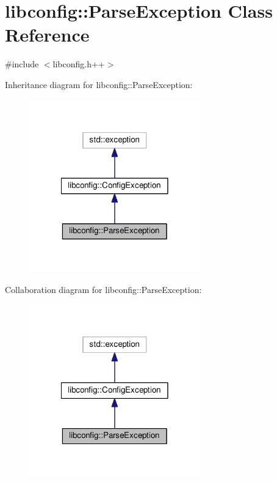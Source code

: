 \hypertarget{classlibconfig_1_1ParseException}{\section{libconfig\-:\-:Parse\-Exception Class Reference}
\label{classlibconfig_1_1ParseException}
}


{\ttfamily \#include $<$libconfig.\-h++$>$}



Inheritance diagram for libconfig\-:\-:Parse\-Exception\-:\nopagebreak
\begin{figure}[H]
\begin{center}
\leavevmode
\includegraphics[width=210pt]{classlibconfig_1_1ParseException__inherit__graph}
\end{center}
\end{figure}


Collaboration diagram for libconfig\-:\-:Parse\-Exception\-:\nopagebreak
\begin{figure}[H]
\begin{center}
\leavevmode
\includegraphics[width=210pt]{classlibconfig_1_1ParseException__coll__graph}
\end{center}
\end{figure}
